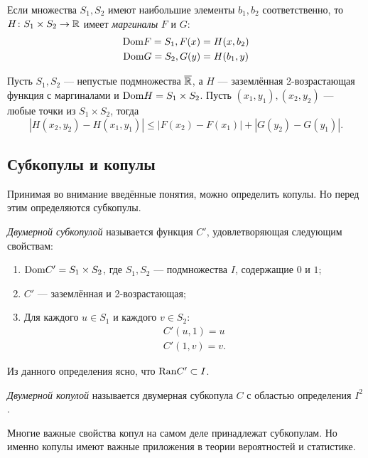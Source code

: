\begin{define}
	Если множества $S_1, S_2$ имеют наибольшие элементы $b_1, b_2$ соответственно, то $H \colon S_1 \times S_2 \to \mathbb{R}$ имеет \emph{маргиналы} $F$ и $G$:
	\begin{gather}
		\mathrm{Dom}{F} = S_1, F(x) = H(x, b_2) \\
		\mathrm{Dom}{G} = S_2, G(y) = H(b_1, y)
	\end{gather}
\end{define}

\begin{lemma}\label{lm:precont}
	Пусть $S_1, S_2$ --- непустые подмножества $\overline{\mathbb{R}}$, а $H$ --- заземлённая 2-возрастающая функция с маргиналами и $\mathrm{Dom}{H} = S_1 \times S_2$. Пусть $(x_1, y_1), (x_2, y_2)$ --- любые точки из $S_1 \times S_2$, тогда
\[
|H(x_2, y_2) - H(x_1, y_1)| \leqslant |F(x_2) - F(x_1)| + |G(y_2) - G(y_1)|.
\]
\end{lemma}

\subsection*{Субкопулы и копулы}

Принимая во внимание введённые понятия, можно определить копулы. Но перед этим определяются субкопулы\cite{Nelsen1999}.

\begin{define}
	\emph{Двумерной субкопулой} называется функция $C'$, удовлетворяющая следующим свойствам:
	\begin{enumerate}
	\item $\mathrm{Dom}{C'} = S_1 \times S_2$, где $S_1, S_2$ --- подмножества $I$, содержащие $0$ и $1$;
	\item $C'$ --- заземлённая и 2-возрастающая;
	\item Для каждого $u \in S_1$ и каждого $v \in S_2$:
		\begin{gather}
			C'(u, 1) = u \\
			C'(1, v) = v.
		\end{gather}
	\end{enumerate}
\end{define}

Из данного определения ясно, что $\mathrm{Ran}{C'} \subset I$.

\begin{define}
	\emph{Двумерной копулой} называется двумерная субкопула $C$ с областью определения $I^2$.
\end{define}

Многие важные свойства копул на самом деле принадлежат субкопулам. Но именно копулы имеют важные приложения в теории вероятностей и статистике.


